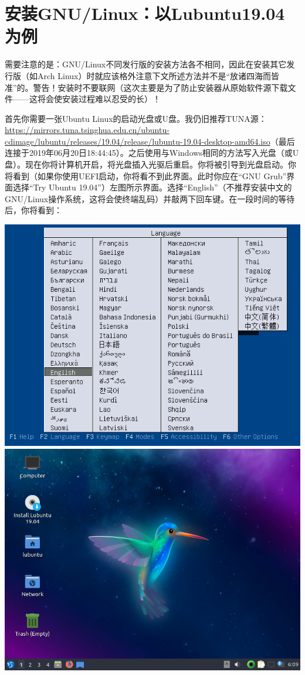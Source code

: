 \chapter{安装GNU/Linux：以Lubuntu19.04为例}
需要注意的是：GNU/Linux不同发行版的安装方法各不相同，因此在安装其它发行版（如Arch Linux）时就应该格外注意下文所述方法并不是“放诸四海而皆准”的。警告！安装时不要联网（这次主要是为了防止安装器从原始软件源下载文件——这将会使安装过程难以忍受的长）！\par
首先你需要一张Ubuntu Linux的启动光盘或U盘。我仍旧推荐TUNA源：\url{https://mirrors.tuna.tsinghua.edu.cn/ubuntu-cdimage/lubuntu/releases/19.04/release/lubuntu-19.04-desktop-amd64.iso}（最后连接于2019年06月20日18:44:45）。之后使用与Windows相同的方法写入光盘（或U盘）。现在你将计算机开启，将光盘插入光驱后重启。你将被引导到光盘启动。你将看到（如果你使用UEFI启动，你将看不到此界面。此时你应在“GNU Grub”界面选择“Try Ubuntu 19.04”）左图所示界面。选择“English”（不推荐安装中文的GNU/Linux操作系统，这将会使终端乱码）并敲两下回车键。在一段时间的等待后，你将看到：
\begin{center}
	\includegraphics[width=0.7\linewidth]{pic/lubinst1}	\includegraphics[width=0.7\linewidth]{pic/lubinst2}
\end{center} \par
